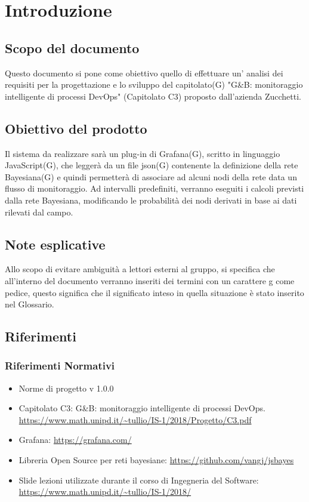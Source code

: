 \section{Introduzione}
		\subsection{Scopo del documento}			
Questo documento si pone come obiettivo quello di effettuare un' analisi dei requisiti per la progettazione e lo sviluppo del capitolato(G) "G\&B: monitoraggio intelligente di processi DevOps" (Capitolato C3) proposto dall'azienda Zucchetti.


		\subsection{Obiettivo del prodotto}

Il sistema da realizzare sarà  un plug-in di Grafana(G), scritto in linguaggio JavaScript(G), che leggerà da un file json(G) contenente la definizione della rete Bayesiana(G) e quindi permetterà di associare ad alcuni nodi della rete data un flusso di monitoraggio.
Ad intervalli predefiniti, verranno eseguiti i calcoli previsti dalla rete Bayesiana, modificando le probabilità dei nodi derivati in base ai dati rilevati dal campo.


		\subsection{Note esplicative}

Allo scopo di evitare ambiguità a lettori esterni al gruppo, si specifica che all'interno del documento verranno inseriti dei termini con un carattere g come pedice, questo significa che il significato inteso in quella situazione è stato inserito nel Glossario.


		\subsection{Riferimenti }

		\subsubsection{Riferimenti Normativi}
		\begin{itemize}
			\item Norme di progetto v 1.0.0
			\item Capitolato C3: G\&B: monitoraggio intelligente di processi DevOps.\newline
			\url{https://www.math.unipd.it/~tullio/IS-1/2018/Progetto/C3.pdf}
			\item Grafana:\newline
			\url{https://grafana.com/}
			\item Libreria Open Source per reti bayesiane:\newline
			\url{https://github.com/vangj/jsbayes}
			\item Slide lezioni utilizzate durante il corso di Ingegneria del Software:\newline
			\url{https://www.math.unipd.it/~tullio/IS-1/2018/}
		\end{itemize}

